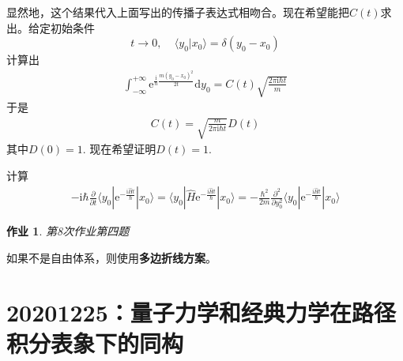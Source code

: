 \documentclass[12pt]{article}
\newtheorem{asg}{作业}
\begin{document}
    显然地，这个结果代入上面写出的传播子表达式相吻合。现在希望能把$C(t)$求出。给定初始条件
    \begin{equation}
        t \to 0,~~~~~\langle y_0|x_0\rangle = \delta(y_0-x_0)
    \end{equation}
    计算出
    \begin{equation}\begin{aligned}
        \int_{-\infty}^{+\infty} \mathrm{e}^{\frac {\mathrm{i}}{\hbar} \frac {m(y_0 - x_0)^2}{2t}}\mathrm{d}y_0 = C(t) \sqrt{\frac {2\pi\mathrm{i}\hbar t}m}
    \end{aligned}\end{equation}
    于是 
    \begin{equation}\begin{aligned}
        C(t) = \sqrt{\frac m{2\pi\mathrm{i}\hbar t}} D(t)
    \end{aligned}\end{equation}
    其中$D(0) = 1$. 现在希望证明$D(t) = 1$.

    计算
    \begin{equation}\begin{aligned}
        -\mathrm{i}\hbar \frac {\partial}{\partial t} \langle y_0 | \mathrm{e}^{-\frac {\mathrm{i}\hat{H}t}{\hbar}} |x_0 \rangle =  \langle y_0 | \hat{H} \mathrm{e}^{-\frac {\mathrm{i}\hat{H}t}{\hbar}} |x_0 \rangle
        = -\frac {\hbar^2}{2m} \frac {\partial^2}{\partial y_0^2} \langle y_0 | \mathrm{e}^{-\frac {\mathrm{i}\hat{H}t}{\hbar}} |x_0 \rangle
    \end{aligned}\end{equation}

    \begin{asg}
        第8次作业第四题
    \end{asg}

    如果不是自由体系，则使用\textbf{多边折线方案}。

\section{20201225：量子力学和经典力学在路径积分表象下的同构}
\end{document}
